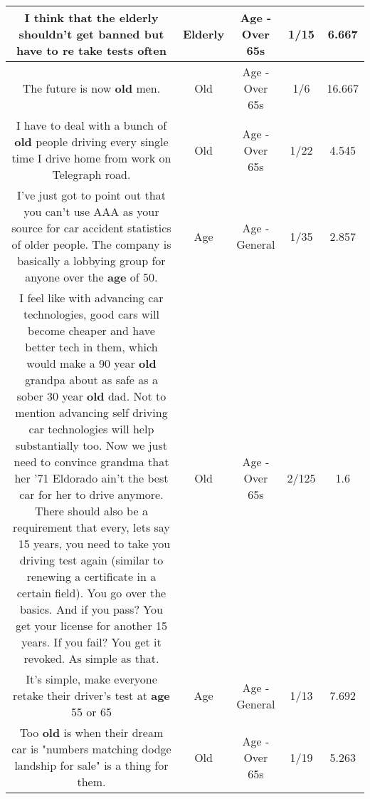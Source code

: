 \documentclass[11pt]{article}
\newlength\mylength
\begin{document}
\begin{center}
\begin{longtable}{|C{.65\mylength}|C{.30\mylength}|C{.12\mylength}|C{.12\mylength}|C{.12\mylength}|}
  \small I think that the \textbf{elderly} shouldn't get banned but have to re take tests often\normalsize   & Elderly & Age - Over 65s & 1/15 & 6.667 \\  \hline
  \small The future is now \textbf{old} men.\normalsize   & Old & Age - Over 65s & 1/6 & 16.667 \\  \hline
  \small I have to deal with a bunch of \textbf{old} people driving every single time I drive home from work on Telegraph road.\normalsize   & Old & Age - Over 65s & 1/22 & 4.545 \\  \hline
  \small I've just got to point out that you can't use AAA as your source for car accident statistics of older people. The company is basically a lobbying group for anyone over the \textbf{age} of 50.\normalsize   & Age & Age - General & 1/35 & 2.857 \\  \hline
  \small I feel like with advancing car technologies, good cars will become cheaper and have better tech in them, which would make a 90 year \textbf{old} grandpa about as safe as a sober 30 year \textbf{old} dad.  Not to mention advancing self driving car technologies will help substantially too.  Now we just need to convince grandma that her '71 Eldorado ain't the best car for her to drive anymore.  There should also be a requirement that every, lets say ~15 years, you need to take you driving test again (similar to renewing a certificate in a certain field). You go over the basics. And if you pass? You get your license for another 15 years.  If you fail? You get it revoked. As simple as that.\normalsize   & Old & Age - Over 65s & 2/125 & 1.6 \\  \hline
  \small It's simple, make everyone retake their driver's test at \textbf{age} 55 or 65\normalsize   & Age & Age - General & 1/13 & 7.692 \\  \hline
  \small Too \textbf{old} is when their dream car is "numbers matching dodge landship for sale" is a thing for them.\normalsize   & Old & Age - Over 65s & 1/19 & 5.263 \\  \hline

\end{longtable}
\end{center}
\end{document}
